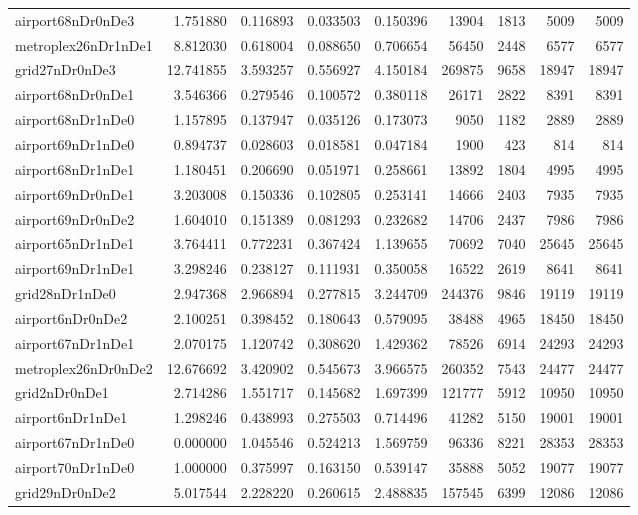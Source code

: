 \begin{longtable}{|l|r|r|r|r|r|r|r|r|}
airport68nDr0nDe3 & 1.751880 & 0.116893 & 0.033503 & 0.150396 & 13904 & 1813 & 5009 & 5009 \\
metroplex26nDr1nDe1 & 8.812030 & 0.618004 & 0.088650 & 0.706654 & 56450 & 2448 & 6577 & 6577 \\
grid27nDr0nDe3 & 12.741855 & 3.593257 & 0.556927 & 4.150184 & 269875 & 9658 & 18947 & 18947 \\
airport68nDr0nDe1 & 3.546366 & 0.279546 & 0.100572 & 0.380118 & 26171 & 2822 & 8391 & 8391 \\
airport68nDr1nDe0 & 1.157895 & 0.137947 & 0.035126 & 0.173073 & 9050 & 1182 & 2889 & 2889 \\
airport69nDr1nDe0 & 0.894737 & 0.028603 & 0.018581 & 0.047184 & 1900 & 423 & 814 & 814 \\
airport68nDr1nDe1 & 1.180451 & 0.206690 & 0.051971 & 0.258661 & 13892 & 1804 & 4995 & 4995 \\
airport69nDr0nDe1 & 3.203008 & 0.150336 & 0.102805 & 0.253141 & 14666 & 2403 & 7935 & 7935 \\
airport69nDr0nDe2 & 1.604010 & 0.151389 & 0.081293 & 0.232682 & 14706 & 2437 & 7986 & 7986 \\
airport65nDr1nDe1 & 3.764411 & 0.772231 & 0.367424 & 1.139655 & 70692 & 7040 & 25645 & 25645 \\
airport69nDr1nDe1 & 3.298246 & 0.238127 & 0.111931 & 0.350058 & 16522 & 2619 & 8641 & 8641 \\
grid28nDr1nDe0 & 2.947368 & 2.966894 & 0.277815 & 3.244709 & 244376 & 9846 & 19119 & 19119 \\
airport6nDr0nDe2 & 2.100251 & 0.398452 & 0.180643 & 0.579095 & 38488 & 4965 & 18450 & 18450 \\
airport67nDr1nDe1 & 2.070175 & 1.120742 & 0.308620 & 1.429362 & 78526 & 6914 & 24293 & 24293 \\
metroplex26nDr0nDe2 & 12.676692 & 3.420902 & 0.545673 & 3.966575 & 260352 & 7543 & 24477 & 24477 \\
grid2nDr0nDe1 & 2.714286 & 1.551717 & 0.145682 & 1.697399 & 121777 & 5912 & 10950 & 10950 \\
airport6nDr1nDe1 & 1.298246 & 0.438993 & 0.275503 & 0.714496 & 41282 & 5150 & 19001 & 19001 \\
airport67nDr1nDe0 & 0.000000 & 1.045546 & 0.524213 & 1.569759 & 96336 & 8221 & 28353 & 28353 \\
airport70nDr1nDe0 & 1.000000 & 0.375997 & 0.163150 & 0.539147 & 35888 & 5052 & 19077 & 19077 \\
grid29nDr0nDe2 & 5.017544 & 2.228220 & 0.260615 & 2.488835 & 157545 & 6399 & 12086 & 12086 \\

\end{longtable}
